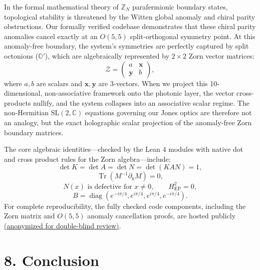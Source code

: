 \documentclass[aps,prl,twocolumn,superscriptaddress,amsmath,amssymb]{revtex4-2}
\begin{document}
In the formal mathematical theory of $\mathbb{Z}_N$ parafermionic boundary states, topological stability is threatened by the Witten global anomaly and chiral parity obstructions. Our formally verified codebase demonstrates that these chiral parity anomalies cancel exactly at an $O(5,5)$ split-orthogonal symmetry point. At this anomaly-free boundary, the system's symmetries are perfectly captured by split octonions ($\mathbb{O}'$), which are algebraically represented by $2 \times 2$ Zorn vector matrices:
\begin{equation}
\mathcal{Z} = \begin{pmatrix} a & \mathbf{x} \\ \mathbf{y} & b \end{pmatrix},
\end{equation}
where $a, b$ are scalars and $\mathbf{x}, \mathbf{y}$ are 3-vectors. When we project this 10-dimensional, non-associative framework onto the photonic layer, the vector cross-products nullify, and the system collapses into an associative scalar regime. The non-Hermitian $\mathrm{SL}(2,\mathbb{C})$ equations governing our Jones optics are therefore not an analogy, but the exact holographic scalar projection of the anomaly-free Zorn boundary matrices.

The core algebraic identities—checked by the Lean 4 modules with native dot and cross product rules for the Zorn algebra—include:
\begin{equation}
\det K=\det A=\det N=\det(KAN)=1,
\end{equation}
\begin{equation}
\operatorname{Tr}(M^{-1}\partial_kM)=0,
\end{equation}
\begin{equation}
N(x) \text{ is defective for } x\neq0, \qquad H_{\mathrm{EP}}^2=0,
\end{equation}
\begin{equation}
B=\operatorname{diag}\left(e^{-i\pi/4}, e^{i\pi/4}, e^{i\pi/4}, e^{-i\pi/4}\right).
\end{equation}
For complete reproducibility, the fully checked code components, including the Zorn matrix and $O(5,5)$ anomaly cancellation proofs, are hosted publicly \href{https://academia.stackexchange.com/questions/220517/anonymizing-a-submission-for-double-blind-review}{(anonymized for double-blind review)}.

\section{8. Conclusion}
\end{document}
